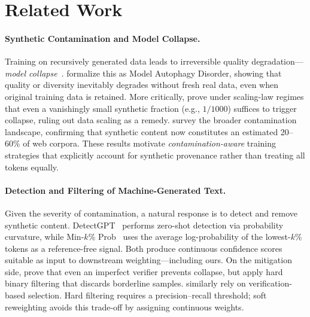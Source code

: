 \section{Related Work}

\paragraph{Synthetic Contamination and Model Collapse.}
Training on recursively generated data leads to irreversible quality degradation---\emph{model collapse}~\citep{shumailov_2024_model_collapse}.
\citet{alemohammad_2024_mad} formalize this as Model Autophagy Disorder, showing that quality or diversity inevitably degrades without fresh real data, even when original training data is retained.
More critically, \citet{dohmatob_2025_strong_collapse} prove under scaling-law regimes that even a vanishingly small synthetic fraction (e.g., $1/1000$) suffices to trigger collapse, ruling out data scaling as a remedy.
\citet{cheng_2025_contamination_survey} survey the broader contamination landscape, confirming that synthetic content now constitutes an estimated 20--60\% of web corpora.
These results motivate \emph{contamination-aware} training strategies that explicitly account for synthetic provenance rather than treating all tokens equally.

\paragraph{Detection and Filtering of Machine-Generated Text.}
Given the severity of contamination, a natural response is to detect and remove synthetic content.
DetectGPT~\citep{mitchell_2023_detectgpt} performs zero-shot detection via probability curvature, while Min-$k$\% Prob~\citep{shi_2024_minkprob} uses the average log-probability of the lowest-$k$\% tokens as a reference-free signal.
Both produce continuous confidence scores suitable as input to downstream weighting---including ours.
On the mitigation side, \citet{feng_2025_beyond_collapse} prove that even an imperfect verifier prevents collapse, but apply hard binary filtering that discards borderline samples.
\citet{guo_2025_escaping_collapse} similarly rely on verification-based selection.
Hard filtering requires a precision--recall threshold; soft reweighting avoids this trade-off by assigning continuous weights.

